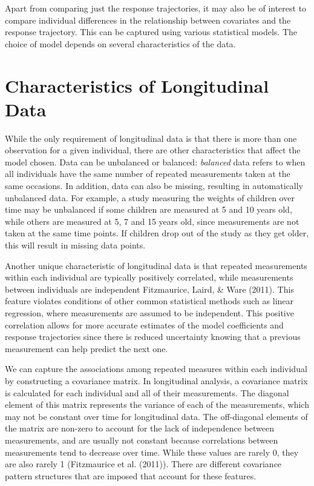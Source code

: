 \documentclass[12pt, twoside]{amherstthesis}
\begin{document}
Apart from comparing just the response trajectories, it may also be of interest to compare individual differences in the relationship between covariates and the response trajectory. This can be captured using various statistical models. The choice of model depends on several characteristics of the data.

\hypertarget{characteristics-of-longitudinal-data}{%
\section{Characteristics of Longitudinal Data}\label{characteristics-of-longitudinal-data}}

While the only requirement of longitudinal data is that there is more than one observation for a given individual, there are other characteristics that affect the model chosen. Data can be unbalanced or balanced: \emph{balanced} data refers to when all individuals have the same number of repeated measurements taken at the same occasions. In addition, data can also be missing, resulting in automatically unbalanced data. For example, a study measuring the weights of children over time may be unbalanced if some children are measured at 5 and 10 years old, while others are measured at 5, 7 and 15 years old, since measurements are not taken at the same time points. If children drop out of the study as they get older, this will result in missing data points.

Another unique characteristic of longitudinal data is that repeated measurements within each individual are typically positively correlated, while measurements between individuals are independent Fitzmaurice, Laird, \& Ware (2011). This feature violates conditions of other common statistical methods such as linear regression, where measurements are assumed to be independent. This positive correlation allows for more accurate estimates of the model coefficients and response trajectories since there is reduced uncertainty knowing that a previous measurement can help predict the next one.

We can capture the associations among repeated measures within each individual by constructing a covariance matrix. In longitudinal analysis, a covariance matrix is calculated for each individual and all of their measurements. The diagonal element of this matrix represents the variance of each of the measurements, which may not be constant over time for longitudinal data. The off-diagonal elements of the matrix are non-zero to account for the lack of independence between measurements, and are usually not constant because correlations between measurements tend to decrease over time. While these values are rarely 0, they are also rarely 1 (Fitzmaurice et al. (2011)). There are different covariance pattern structures that are imposed that account for these features.
\end{document}
